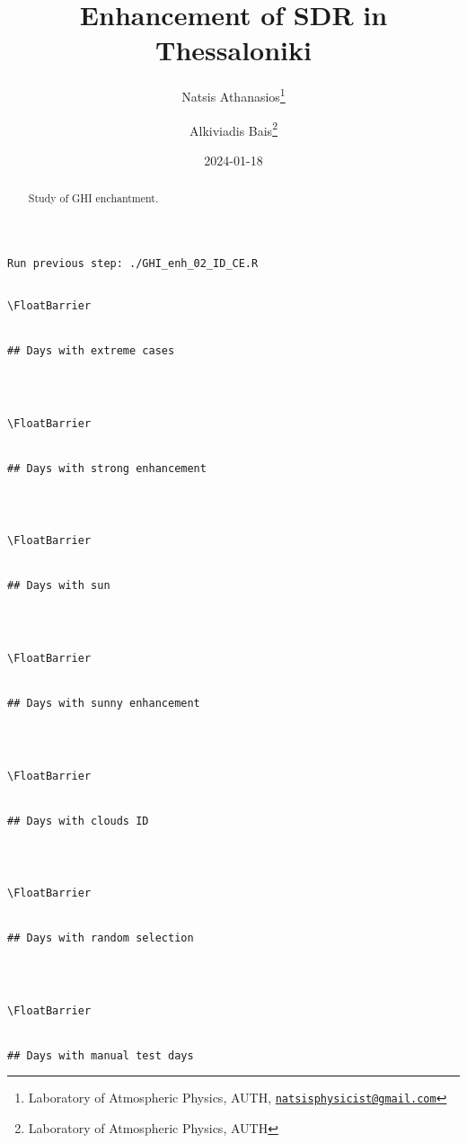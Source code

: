 \documentclass[
  10pt,
  a4paper,oneside]{article}
\title{Enhancement of SDR in Thessaloniki}
\author{Natsis Athanasios\footnote{Laboratory of Atmospheric Physics, AUTH, \href{mailto:natsisphysicist@gmail.com}{\nolinkurl{natsisphysicist@gmail.com}}} \and Alkiviadis Bais\footnote{Laboratory of Atmospheric Physics, AUTH}}
\date{2024-01-18}
\begin{document}
\maketitle
\begin{abstract}
Study of GHI enchantment.
\end{abstract}

{
\hypersetup{linkcolor=}
\setcounter{tocdepth}{4}
\tableofcontents
}
\begin{verbatim}
Run previous step: ./GHI_enh_02_ID_CE.R
\end{verbatim}

\begin{verbatim}

\FloatBarrier


## Days with extreme cases 
\end{verbatim}

\begin{verbatim}
 
 

\FloatBarrier


## Days with strong enhancement 
\end{verbatim}

\begin{verbatim}
 
 

\FloatBarrier


## Days with sun 
\end{verbatim}

\begin{verbatim}
 
 

\FloatBarrier


## Days with sunny enhancement 
\end{verbatim}

\begin{verbatim}
 
 

\FloatBarrier


## Days with clouds ID 
\end{verbatim}

\begin{verbatim}
 
 

\FloatBarrier


## Days with random selection 
\end{verbatim}

\begin{verbatim}
 
 

\FloatBarrier


## Days with manual test days 
\end{verbatim}
\end{document}
